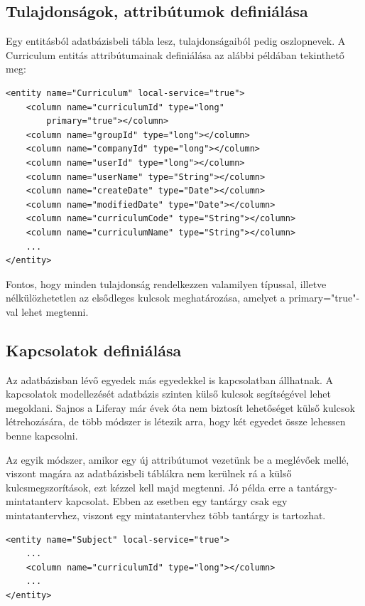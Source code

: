\documentclass[hidelinks, 12pt, a4paper]{report}
\begin{document}
\subsection{Tulajdonságok, attribútumok definiálása}

Egy entitásból adatbázisbeli tábla lesz, tulajdonságaiból pedig oszlopnevek. A Curriculum entitás attribútumainak definiálása az alábbi példában tekinthető meg:

\begin{minipage}{\linewidth}
\begin{lstlisting}[basicstyle=\small]
<entity name="Curriculum" local-service="true">
	<column name="curriculumId" type="long"
		primary="true"></column>
	<column name="groupId" type="long"></column>
	<column name="companyId" type="long"></column>
	<column name="userId" type="long"></column>
	<column name="userName" type="String"></column>
	<column name="createDate" type="Date"></column>
	<column name="modifiedDate" type="Date"></column>
	<column name="curriculumCode" type="String"></column>
	<column name="curriculumName" type="String"></column>
	...
</entity>
\end{lstlisting}
\end{minipage}

Fontos, hogy minden tulajdonság rendelkezzen valamilyen típussal, illetve nélkülözhetetlen az elsődleges kulcsok meghatározása, amelyet a primary="true"-val lehet megtenni.

\subsection{Kapcsolatok definiálása}

Az adatbázisban lévő egyedek más egyedekkel is kapcsolatban állhatnak. A kapcsolatok modellezését adatbázis szinten külső kulcsok segítségével lehet megoldani. Sajnos a Liferay már évek óta nem biztosít lehetőséget külső kulcsok létrehozására, de több módszer is létezik arra, hogy két egyedet össze lehessen benne kapcsolni.

Az egyik módszer, amikor egy új attribútumot vezetünk be a meglévőek mellé, viszont magára az adatbázisbeli táblákra nem kerülnek rá a külső kulcsmegszorítások, ezt kézzel kell majd megtenni. Jó példa erre a tantárgy-mintatanterv kapcsolat. Ebben az esetben egy tantárgy csak egy mintatantervhez, viszont egy mintatantervhez több tantárgy is tartozhat.

\begin{minipage}{\linewidth}
\begin{lstlisting}[basicstyle=\small]
<entity name="Subject" local-service="true">
	...
	<column name="curriculumId" type="long"></column>
	...
</entity>
\end{lstlisting}
\end{minipage}
\end{document}
